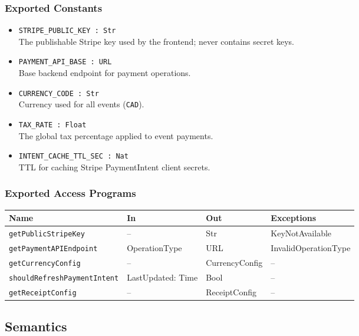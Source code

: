 \documentclass[12pt, titlepage]{article}
\begin{document}
\subsubsection{Exported Constants}

\begin{itemize}
    \item \texttt{STRIPE\_PUBLIC\_KEY : Str}\\
    The publishable Stripe key used by the frontend; never contains secret keys.
    \item \texttt{PAYMENT\_API\_BASE : URL}\\
    Base backend endpoint for payment operations.
    \item \texttt{CURRENCY\_CODE : Str}\\
    Currency used for all events (\texttt{CAD}).
    \item \texttt{TAX\_RATE : Float}\\
    The global tax percentage applied to event payments.
    \item \texttt{INTENT\_CACHE\_TTL\_SEC : Nat}\\
    TTL for caching Stripe PaymentIntent client secrets.
\end{itemize}

\subsubsection{Exported Access Programs}

\begin{center}
\renewcommand{\arraystretch}{1.2}
\begin{tabularx}{\textwidth}{l l l X}
\toprule
\textbf{Name} & \textbf{In} & \textbf{Out} & \textbf{Exceptions} \\
\midrule
\texttt{getPublicStripeKey} & -- & Str & KeyNotAvailable \\
\texttt{getPaymentAPIEndpoint} & OperationType & URL & InvalidOperationType \\
\texttt{getCurrencyConfig} & -- & CurrencyConfig & -- \\
\texttt{shouldRefreshPaymentIntent} & LastUpdated: Time & Bool & -- \\
\texttt{getReceiptConfig} & -- & ReceiptConfig & -- \\
\bottomrule
\end{tabularx}
\end{center}

\subsection{Semantics}
\end{document}
